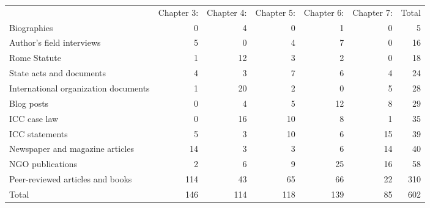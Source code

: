\begin{tabular}{lrrrrrr}
 & Chapter 3: & Chapter 4: & Chapter 5: & Chapter 6: & Chapter 7: & Total \\
Biographies & 0 & 4 & 0 & 1 & 0 & 5 \\
Author's field interviews & 5 & 0 & 4 & 7 & 0 & 16 \\
Rome Statute & 1 & 12 & 3 & 2 & 0 & 18 \\
State acts and documents & 4 & 3 & 7 & 6 & 4 & 24 \\
International organization documents & 1 & 20 & 2 & 0 & 5 & 28 \\
Blog posts & 0 & 4 & 5 & 12 & 8 & 29 \\
ICC case law & 0 & 16 & 10 & 8 & 1 & 35 \\
ICC statements & 5 & 3 & 10 & 6 & 15 & 39 \\
Newspaper and magazine articles & 14 & 3 & 3 & 6 & 14 & 40 \\
NGO publications & 2 & 6 & 9 & 25 & 16 & 58 \\
Peer-reviewed articles and books & 114 & 43 & 65 & 66 & 22 & 310 \\
Total & 146 & 114 & 118 & 139 & 85 & 602 \\
\end{tabular}
